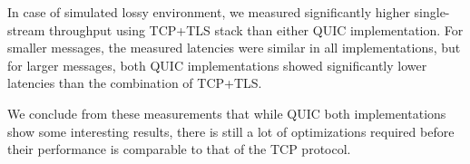 In case of simulated lossy environment, we measured significantly higher single-stream throughput
using TCP+TLS stack than either QUIC implementation. For smaller messages, the measured latencies
were similar in all implementations, but for larger messages, both QUIC implementations showed
significantly lower latencies than the combination of TCP+TLS.

We conclude from these measurements that while QUIC both implementations show some interesting
results, there is still a lot of optimizations required before their performance is comparable to
that of the TCP protocol.
